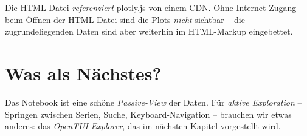 \begin{merke}
Die HTML-Datei \emph{referenziert} plotly.js von einem CDN. Ohne
Internet-Zugang beim Öffnen der HTML-Datei sind die Plots
\emph{nicht} sichtbar -- die zugrundeliegenden Daten sind aber
weiterhin im HTML-Markup eingebettet.
\end{merke}

\section{Was als Nächstes?}

Das Notebook ist eine schöne \emph{Passive-View} der Daten. Für
\emph{aktive Exploration} -- Springen zwischen Serien, Suche,
Keyboard-Navigation -- brauchen wir etwas anderes: das
\emph{OpenTUI-Explorer}, das im nächsten Kapitel vorgestellt wird.
